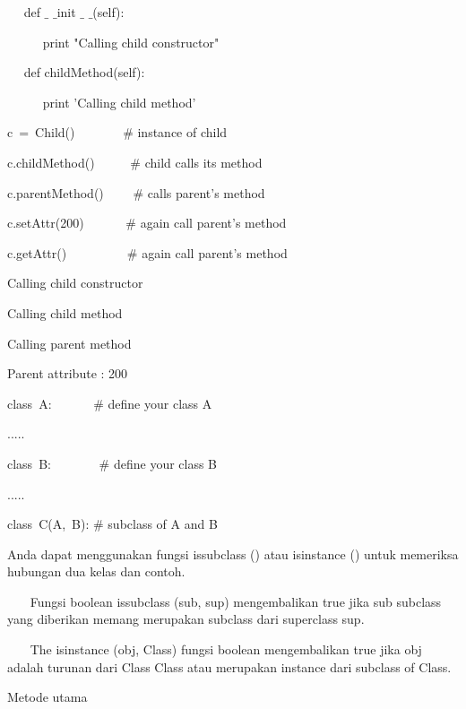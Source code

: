 ~~ def  $  \_  $ $  \_  $init $  \_  $ $  \_  $(self): \par
~~~~~ print "Calling child constructor" \par
\vspace{12pt}
~~ def childMethod(self): \par
~~~~~ print 'Calling child method' \par
\vspace{12pt}
c~=~Child()~~~~~~~    $  \#  $ instance of child \par
c.childMethod()~~~~~  $  \#  $ child calls its method \par
c.parentMethod()~~~~  $  \#  $ calls parent's method \par
c.setAttr(200)~~~~~~  $  \#  $ again call parent's method \par
c.getAttr()~~~~~~~~~  $  \#  $ again call parent's method \par
\vspace{12pt}
Calling child constructor \par
Calling child method \par
Calling parent method \par
Parent attribute : 200 \par
\vspace{12pt}
class~A:~~~~~~   $  \#  $ define your class A \par
..... \par
\vspace{12pt}
class~B:~~~~~~~   $  \#  $ define your class B \par
..... \par
\vspace{12pt}
class~C(A,~B):    $  \#  $ subclass of A and B \par
Anda dapat menggunakan fungsi issubclass () atau isinstance () untuk memeriksa hubungan dua kelas dan contoh. \par
\vspace{12pt}
~~~ Fungsi boolean issubclass (sub, sup) mengembalikan true jika sub subclass yang diberikan memang merupakan subclass dari superclass sup. \par
\vspace{12pt}
~~~ The isinstance (obj, Class) fungsi boolean mengembalikan true jika obj adalah turunan dari Class Class atau merupakan instance dari subclass of Class. \par
\vspace{12pt}
Metode utama \par
\vspace{12pt}
